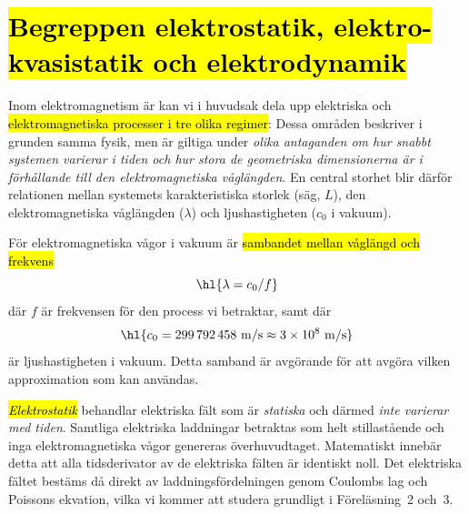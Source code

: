 {\section{\hl{Begreppen elektrostatik, elektro-kvasistatik och elektrodynamik}}
Inom elektromagnetism {\"a}r kan vi i huvudsak dela upp elektriska och
{\hl{elektromagnetiska processer i tre olika regimer}}:
\noindent
Dessa omr{\aa}den beskriver i grunden samma fysik, men {\"a}r giltiga under
{\it olika antaganden om hur snabbt systemen varierar i tiden och hur stora
de geometriska dimensionerna {\"a}r i f{\"o}rh{\aa}llande till den
elektromagnetiska v{\aa}gl{\"a}ngden}.
En central storhet blir d{\"a}rf{\"o}r relationen mellan systemets
karakteristiska storlek (s{\"a}g, $L$), den elektromagnetiska
v{\aa}gl{\"a}ngden ($\lambda$) och ljushastigheten ($c_0$ i vakuum).

F{\"o}r elektromagnetiska v{\aa}gor i vakuum {\"a}r {\hl{sambandet mellan
v{\aa}gl{\"a}ngd och frekvens}}
$$
  \hl{\lambda = {{c_0}/{f}}}
$$
d{\"a}r $f$ {\"a}r frekvensen f{\"o}r den process vi betraktar, samt d{\"a}r
$$
  \hl{c_0=299\,792\,458\ {\rm m}/{\rm s}\approx 3\times 10^8\ {\rm m}/{\rm s}}
$$
{\"a}r ljushastigheten  i vakuum.
Detta samband {\"a}r avg{\"o}rande f{\"o}r att avg{\"o}ra vilken approximation
som kan anv{\"a}ndas.

{\it{\hl{Elektrostatik}}} behandlar elektriska f{\"a}lt som {\"a}r
{\it statiska} och d{\"a}rmed {\it inte varierar med tiden}.
Samtliga elektriska laddningar betraktas som helt stillast{\aa}ende och inga
elektromagnetiska v{\aa}gor genereras {\"o}verhuvudtaget.
Matematiskt inneb{\"a}r detta att alla tidsderivator av de elektriska
f{\"a}lten {\"a}r identiskt noll. Det elektriska f{\"a}ltet best{\"a}ms d{\aa}
direkt av laddningsf{\"o}rdelningen genom Coulombs lag och Poissons ekvation,
vilka vi kommer att studera grundligt i F{\"o}rel{\"a}sning~2 och~3.

}
